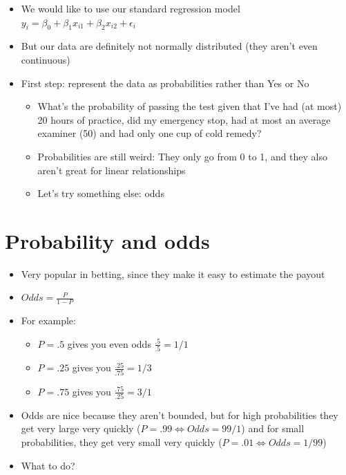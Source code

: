 \documentclass[]{article}
\begin{document}
\begin{itemize}
\itemsep1pt\parskip0pt
\item
  We would like to use our standard regression model
  $y_{i} = \beta_0 + \beta_1 x_{i1} + \beta_2 x_{i2} + \epsilon_i$
\item
  But our data are definitely not normally distributed (they aren't even
  continuous)
\item
  First step: represent the data as probabilities rather than Yes or No

  \begin{itemize}
  \itemsep1pt\parskip0pt
  \item
    What's the probability of passing the test given that I've had (at
    most) 20 hours of practice, did my emergency stop, had at most an
    average examiner (50) and had only one cup of cold remedy?
  \item
    Probabilities are still weird: They only go from 0 to 1, and they
    also aren't great for linear relationships
  \item
    Let's try something else: odds
  \end{itemize}
\end{itemize}

\section{Probability and odds}\label{probability-and-odds}

\begin{itemize}
\itemsep1pt\parskip0pt
\item
  Very popular in betting, since they make it easy to estimate the
  payout
\item
  $Odds = \frac{P}{1-P}$
\item
  For example:

  \begin{itemize}
  \itemsep1pt\parskip0pt
  \item
    $P = .5$ gives you even odds $\frac{.5}{.5} = 1/1$
  \item
    $P = .25$ gives you $\frac{.25}{.75} = 1/3$
  \item
    $P = .75$ gives you $\frac{.75}{.25} = 3/1$
  \end{itemize}
\item
  Odds are nice because they aren't bounded, but for high probabilities
  they get very large very quickly
  ($P = .99 \Leftrightarrow Odds = 99/1$) and for small probabilities,
  they get very small very quickly
  ($P = .01 \Leftrightarrow Odds = 1/99$)
\item
  What to do?
\end{itemize}
\end{document}
